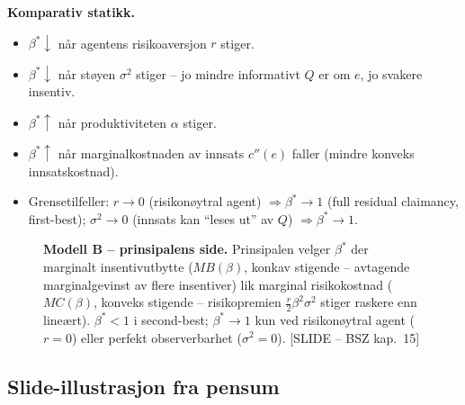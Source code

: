 \textbf{Komparativ statikk.}
\begin{itemize}\setlength{\itemsep}{2pt}
\item $\beta^{*}\downarrow$ når agentens risikoaversjon $r$ stiger.
\item $\beta^{*}\downarrow$ når støyen $\sigma^{2}$ stiger -- jo mindre informativt $Q$ er om $e$, jo svakere insentiv.
\item $\beta^{*}\uparrow$ når produktiviteten $\alpha$ stiger.
\item $\beta^{*}\uparrow$ når marginalkostnaden av innsats $c''(e)$ faller (mindre konveks innsatskostnad).
\item Grensetilfeller: $r\to 0$ (risikonøytral agent) $\Rightarrow\beta^{*}\to 1$ (full residual claimancy, first-best); $\sigma^{2}\to 0$ (innsats kan ``leses ut'' av $Q$) $\Rightarrow\beta^{*}\to 1$.
\end{itemize}

\begin{figure}[H]
\centering
{}
\caption{\textbf{Modell B -- prinsipalens side.} Prinsipalen velger $\beta^{*}$ der marginalt insentivutbytte ($MB(\beta)$, konkav stigende -- avtagende marginalgevinst av flere insentiver) lik marginal risikokostnad ($MC(\beta)$, konveks stigende -- risikopremien $\tfrac{r}{2}\beta^{2}\sigma^{2}$ stiger raskere enn lineært). $\beta^{*}<1$ i second-best; $\beta^{*}\to 1$ kun ved risikonøytral agent ($r=0$) eller perfekt observerbarhet ($\sigma^{2}=0$). [SLIDE -- BSZ kap.\ 15]}
\end{figure}

\subsection*{Slide-illustrasjon fra pensum}

